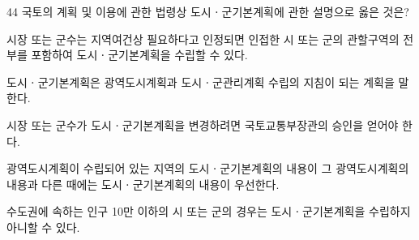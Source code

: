 \begin{question}{44}
국토의 계획 및 이용에 관한 법령상 도시ㆍ군기본계획에 관한 설명으로 옳은 것은?
\begin{choices}
  \item 시장 또는 군수는 지역여건상 필요하다고 인정되면 인접한 시 또는 군의 관할구역의 전부를 포함하여 도시ㆍ군기본계획을 수립할 수 있다.
  \item 도시ㆍ군기본계획은 광역도시계획과 도시ㆍ군관리계획 수립의 지침이 되는 계획을 말한다.
  \item 시장 또는 군수가 도시ㆍ군기본계획을 변경하려면 국토교통부장관의 승인을 얻어야 한다.
  \item 광역도시계획이 수립되어 있는 지역의 도시ㆍ군기본계획의 내용이 그 광역도시계획의 내용과 다른 때에는 도시ㆍ군기본계획의 내용이 우선한다.
  \item 수도권에 속하는 인구 10만 이하의 시 또는 군의 경우는 도시ㆍ군기본계획을 수립하지 아니할 수 있다.
\end{choices}
\end{question}
